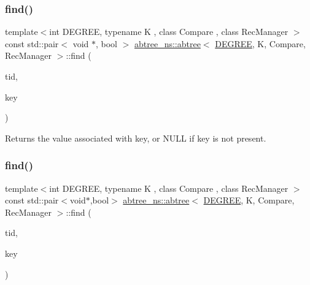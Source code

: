 \mbox{\label{classabtree__ns_1_1abtree_afe6bc900a49ea86e5c12e4ab1eb2ce24}} 
\subsubsection{\texorpdfstring{find()}{find()}\hspace{0.1cm}{\footnotesize\ttfamily [1/2]}}
{\footnotesize\ttfamily template$<$int D\+E\+G\+R\+EE, typename K , class Compare , class Rec\+Manager $>$ \\
const std\+::pair$<$ void $\ast$, bool $>$ \hyperlink{classabtree__ns_1_1abtree}{abtree\+\_\+ns\+::abtree}$<$ \hyperlink{brown__sigouin__abtree__kcas_2adapter_8h_a5d88b17d70c985f2f2b8e987037fd6dd}{D\+E\+G\+R\+EE}, K, Compare, Rec\+Manager $>$\+::find (\begin{DoxyParamCaption}\item[{const int}]{tid,  }\item[{const K \&}]{key }\end{DoxyParamCaption})}

Returns the value associated with key, or N\+U\+LL if key is not present. \mbox{\label{classabtree__ns_1_1abtree_a1c00df7fc97050e840da6e08c878e848}} 
\subsubsection{\texorpdfstring{find()}{find()}\hspace{0.1cm}{\footnotesize\ttfamily [2/2]}}
{\footnotesize\ttfamily template$<$int D\+E\+G\+R\+EE, typename K , class Compare , class Rec\+Manager $>$ \\
const std\+::pair$<$void$\ast$,bool$>$ \hyperlink{classabtree__ns_1_1abtree}{abtree\+\_\+ns\+::abtree}$<$ \hyperlink{brown__sigouin__abtree__kcas_2adapter_8h_a5d88b17d70c985f2f2b8e987037fd6dd}{D\+E\+G\+R\+EE}, K, Compare, Rec\+Manager $>$\+::find (\begin{DoxyParamCaption}\item[{const int}]{tid,  }\item[{const K \&}]{key }\end{DoxyParamCaption})}

